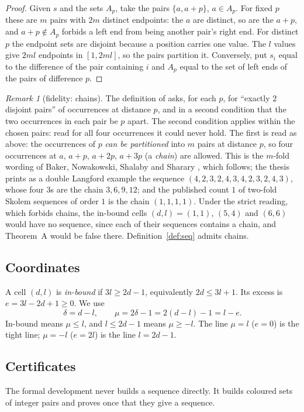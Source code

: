 \documentclass[11pt]{amsart}
\theoremstyle{plain}
\theoremstyle{definition}
\theoremstyle{remark}
\newtheorem{remark}[theorem]{Remark}
\begin{document}
\begin{proof}
Given $s$ and the sets $A_p$, take the pairs $\{a,a+p\}$, $a \in A_p$. For fixed $p$
these are $m$ pairs with $2m$ distinct endpoints: the $a$ are distinct, so are the
$a+p$, and $a + p \notin A_p$ forbids a left end from being another pair's right end. For
distinct $p$ the endpoint sets are disjoint because a position carries one value. The
$l$ values give $2ml$ endpoints in $[1,2ml]$, so the pairs partition it. Conversely, put
$s_i$ equal to the difference of the pair containing $i$ and $A_p$ equal to the set of
left ends of the pairs of difference $p$.
\end{proof}

\begin{remark}[fidelity: chains]\label{rem:chains}
The definition of \cite{ADH} asks, for each $p$, for ``exactly $2$ disjoint pairs'' of
occurrences at distance $p$, and in a second condition that the two occurrences in each
pair be $p$ apart. The second condition applies within the chosen pairs: read for all
four occurrences it could never hold. The first is read as above: the occurrences of $p$
\emph{can be partitioned} into $m$ pairs at distance $p$, so four occurrences at $a$,
$a+p$, $a+2p$, $a+3p$ (a \emph{chain}) are allowed. This is the $m$-fold wording of
Baker, Nowakowski, Shalaby and Sharary \cite{BNSS}, which \cite{ADH} follows; the
thesis \cite{Alk} prints as a double Langford example the sequence
$(4,2,3,2,4,3,4,2,3,2,4,3)$, whose four $3$s are the chain $3,6,9,12$; and the published
count $1$ of two-fold Skolem sequences of order $1$ \cite{GRS} is the chain $(1,1,1,1)$.
Under the strict reading, which forbids chains, the in-bound cells $(d,l) = (1,1)$,
$(5,4)$ and $(6,6)$ would have no sequence, since each of their sequences contains a
chain, and Theorem~A would be false there. Definition~\ref{def:seq} admits chains.
\end{remark}

\subsection*{Coordinates}
A cell $(d,l)$ is \emph{in-bound} if $3l \ge 2d-1$, equivalently $2d \le 3l+1$. Its
excess is $e = 3l-2d+1 \ge 0$. We use
\[
  \delta = d - l, \qquad \mu = 2\delta - 1 = 2(d-l)-1 = l - e .
\]
In-bound means $\mu \le l$, and $l \le 2d-1$ means $\mu \ge -l$. The line $\mu = l$
($e = 0$) is the tight line; $\mu = -l$ ($e = 2l$) is the line $l = 2d-1$.

\subsection*{Certificates}
The formal development never builds a sequence directly. It builds coloured sets of
integer pairs and proves once that they give a sequence.
\end{document}
